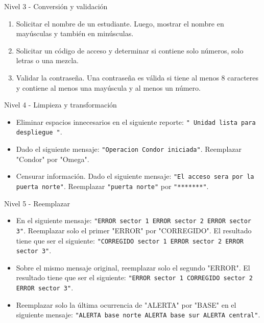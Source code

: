 \documentclass{beamer}
\begin{document}
    \begin{frame}[fragile, t]{Nivel 3 - Conversión y validación}
        \begin{enumerate}
            \item Solicitar el nombre de un estudiante. Luego, mostrar el nombre en mayúsculas y también en minúsculas.
            \item Solicitar un código de acceso y determinar si contiene solo números, solo letras o una mezcla.
            \item Validar la contraseña. Una contraseña es válida si tiene al menos 8 caracteres y contiene al menos una mayúscula
            y al menos un número.
        \end{enumerate}
    \end{frame}

    \begin{frame}[fragile, t]{Nivel 4 - Limpieza y transformación}
        \begin{itemize}
            \item Eliminar espacios innecesarios en el siguiente reporte: \texttt{"      Unidad lista para despliegue      "}.
            \item Dado el siguiente mensaje: \texttt{"Operacion Condor iniciada"}. Reemplazar "Condor" por "Omega".
            \item Censurar información. Dado el siguiente mensaje: \texttt{"El acceso sera por la puerta norte"}. Reemplazar \texttt{"puerta norte"} por \texttt{"*******"}.
        \end{itemize}
    \end{frame}

    \begin{frame}[fragile, t]{Nivel 5 - Reemplazar}
        \begin{itemize}
            \item En el siguiente mensaje: \texttt{"ERROR sector 1 ERROR sector 2 ERROR sector 3"}. Reemplazar solo el primer "ERROR" por "CORREGIDO". El resultado tiene que ser el siguiente: \texttt{"CORREGIDO sector 1 ERROR sector 2 ERROR sector 3"}.
            \item Sobre el mismo mensaje original, reemplazar solo el segundo "ERROR". El resultado tiene que ser el siguiente: \texttt{"ERROR sector 1 CORREGIDO sector 2 ERROR sector 3"}.
            \item Reemplazar solo la última ocurrencia de "ALERTA" por "BASE" en el siguiente mensaje: \texttt{"ALERTA base norte ALERTA base sur ALERTA central"}.
        \end{itemize}
    \end{frame}
\end{document}
